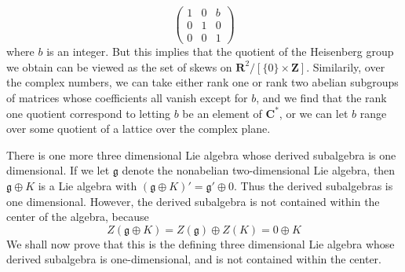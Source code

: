 %
\[ \begin{pmatrix} 1 & 0 & b \\ 0 & 1 & 0 \\ 0 & 0 & 1 \end{pmatrix} \]
%
where $b$ is an integer. But this implies that the quotient of the Heisenberg group we obtain can be viewed as the set of skews on $\mathbf{R}^2/[\{ 0 \} \times \mathbf{Z}]$. Similarily, over the complex numbers, we can take either rank one or rank two abelian subgroups of matrices whose coefficients all vanish except for $b$, and we find that the rank one quotient correspond to letting $b$ be an element of $\mathbf{C}^*$, or we can let $b$ range over some quotient of a lattice over the complex plane.

There is one more three dimensional Lie algebra whose derived subalgebra is one dimensional. If we let $\mathfrak{g}$ denote the nonabelian two-dimensional Lie algebra, then $\mathfrak{g} \oplus K$ is a Lie algebra with $(\mathfrak{g} \oplus K)' = \mathfrak{g}' \oplus 0$. Thus the derived subalgebras is one dimensional. However, the derived subalgebra is not contained within the center of the algebra, because
%
\[ Z(\mathfrak{g} \oplus K) = Z(\mathfrak{g}) \oplus Z(K) = 0 \oplus K \]
%
We shall now prove that this is the defining three dimensional Lie algebra whose derived subalgebra is one-dimensional, and is not contained within the center.

